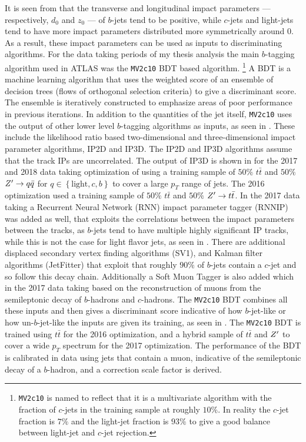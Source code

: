 It is seen from  that the transverse and longitudinal impact parameters --- respectively, $d_{0}$ and $z_{0}$ --- of $b$-jets tend to be positive, while $c$-jets and light-jets tend to have more impact parameters distributed more symmetrically around $0$.
As a result, these impact parameters can be used as inputs to discriminating algorithms.
For the data taking periods of my thesis analysis the main $b$-tagging algorithm used in ATLAS was the \texttt{MV2c10} \gls{BDT} based algorithm.%
\footnote{\texttt{MV2c10} is named to reflect that it is a multivariate algorithm with the fraction of $c$-jets in the training sample at roughly $10\%$.
 In reality the $c$-jet fraction is $7\%$ and the light-jet fraction is $93\%$ to give a good balance between light-jet and $c$-jet rejection.}
A \gls{BDT} is a machine learning algorithm that uses the weighted score of an ensemble of decision trees (flows of orthogonal selection criteria) to give a discriminant score.
The ensemble is iteratively constructed to emphasize areas of poor performance in previous iterations.
In addition to the quantities of the jet itself, \texttt{MV2c10} uses the output of other lower level $b$-tagging algorithms as inputs, as seen in .
These include the likelihood ratio based two-dimensional and three-dimensional impact parameter algorithms, IP2D and IP3D.
The IP2D and IP3D algorithms assume that the track IPs are uncorrelated.
The output of IP3D is shown in  for the 2017 and 2018 data taking optimization of using a training sample of $50\%$ $t\bar{t}$ and $50\%$ $Z^{\prime} \to q\bar{q}$ for $q\in\left\{\mathrm{light}, c, b\right\}$ to cover a large $p_{T}$ range of jets.
The 2016 optimization used a training sample of $50\%$ $t\bar{t}$ and $50\%$ $Z^{\prime} \to t\bar{t}$.
In the 2017 data taking a Recurrent Neural Network (RNN) impact parameter tagger (RNNIP)~\cite{ATL-PHYS-PUB-2017-003} was added as well, that exploits the correlations between the impact parameters between the tracks, as $b$-jets tend to have multiple highly significant IP tracks, while this is not the case for light flavor jets, as seen in .
There are additional displaced secondary vertex finding algorithms (SV1), and Kalman filter algorithms (JetFitter) that exploit that roughly $90\%$ of $b$-jets contain a $c$-jet and so follow this decay chain.
Additionally a Soft Muon Tagger is also added which in the 2017 data taking based on
the reconstruction of muons from the semileptonic decay of $b$-hadrons and $c$-hadrons.
The \texttt{MV2c10} BDT combines all these inputs and then gives a discriminant score indicative of how $b$-jet-like or how un-$b$-jet-like the inputs are given its training, as seen in .
The \texttt{MV2c10} BDT is trained using $t\bar{t}$ for the 2016 optimization, and a hybrid sample of $t\bar{t}$ and $Z^{\prime}$ to cover a wide $p_{T}$ spectrum for the 2017 optimization.
The performance of the BDT is calibrated in data using jets that contain a muon, indicative of the semileptonic decay of a $b$-hadron, and a correction scale factor is derived.

